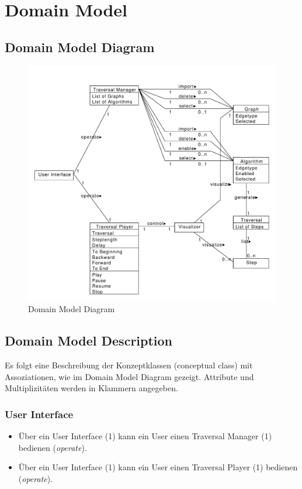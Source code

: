 \section{Domain Model}
\label{sec:Domain Model}
% 
\subsection{Domain Model Diagram}
\label{subsec:Domain Model Diagram}
\begin{figure}[H]
    \includegraphics[totalheight=0.55\textheight]{diagrams/domain-model-diagram.pdf}
    \caption{Domain Model Diagram}
    \label{fig:domain_model_diagram}
\end{figure}
% 
\subsection{Domain Model Description}
\label{subsec:Domain Model Description}
Es folgt eine Beschreibung der Konzeptklassen (conceptual class) mit Assoziationen, wie im Domain Model Diagram gezeigt. Attribute und Multiplizit\"aten werden in Klammern angegeben.
% 
\subsubsection{User Interface}
\label{subsubsec:User Interface}
\begin{itemize}
  \item \"Uber ein User Interface (1) kann ein User einen Traversal Manager (1) bedienen (\textit{operate}).
  \item \"Uber ein User Interface (1) kann ein User einen Traversal Player (1) bedienen (\textit{operate}).
\end{itemize}
% 
